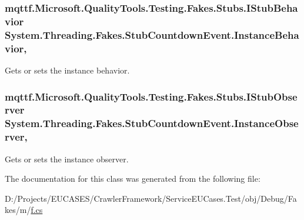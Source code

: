 \hypertarget{class_system_1_1_threading_1_1_fakes_1_1_stub_countdown_event_a5aba6825191224976438127295740258}{
\subsubsection[{Instance\-Behavior}]{\setlength{\rightskip}{0pt plus 5cm}mqttf.\-Microsoft.\-Quality\-Tools.\-Testing.\-Fakes.\-Stubs.\-I\-Stub\-Behavior System.\-Threading.\-Fakes.\-Stub\-Countdown\-Event.\-Instance\-Behavior\hspace{0.3cm}{\ttfamily [get]}, {\ttfamily [set]}}}\label{class_system_1_1_threading_1_1_fakes_1_1_stub_countdown_event_a5aba6825191224976438127295740258}


Gets or sets the instance behavior.

\hypertarget{class_system_1_1_threading_1_1_fakes_1_1_stub_countdown_event_a75cb912f7bf345af0605d80f69ed9659}{
\subsubsection[{Instance\-Observer}]{\setlength{\rightskip}{0pt plus 5cm}mqttf.\-Microsoft.\-Quality\-Tools.\-Testing.\-Fakes.\-Stubs.\-I\-Stub\-Observer System.\-Threading.\-Fakes.\-Stub\-Countdown\-Event.\-Instance\-Observer\hspace{0.3cm}{\ttfamily [get]}, {\ttfamily [set]}}}\label{class_system_1_1_threading_1_1_fakes_1_1_stub_countdown_event_a75cb912f7bf345af0605d80f69ed9659}


Gets or sets the instance observer.



The documentation for this class was generated from the following file\-:\begin{DoxyCompactItemize}
\item 
D\-:/\-Projects/\-E\-U\-C\-A\-S\-E\-S/\-Crawler\-Framework/\-Service\-E\-U\-Cases.\-Test/obj/\-Debug/\-Fakes/m/\hyperlink{m_2f_8cs}{f.\-cs}\end{DoxyCompactItemize}
